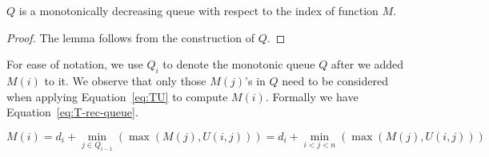 
\begin{lemma} \label{lm:monotonicQueue}
$Q$ is a monotonically decreasing queue with respect to the index of function $M$.
\end{lemma}
\begin{proof}
The lemma follows from the construction of $Q$.
\end{proof}

For ease of notation, we use $Q_i$ to denote the monotonic queue $Q$ after we added $M(i)$ to it.
We observe that only those $M(j)$'s in $Q$ need to be considered when applying Equation~\ref{eq:TU} to compute $M(i)$.
Formally we have Equation~\ref{eq:T-rec-queue}.

\begin{equation}
M(i) = d_i + \min_{j \in Q_{i-1}}(\max(M(j), U(i, j))) = d_i + \min_{i < j < n}(\max(M(j), U(i, j))) \label{eq:T-rec-queue}
\end{equation}

